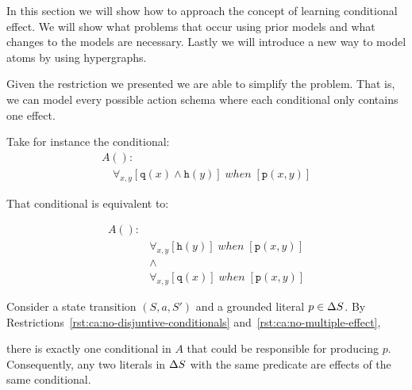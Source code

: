 \documentclass[\master/Master.tex]{subfiles}
\begin{document}
%

In this section we will show how to approach the concept of learning conditional effect. We will show what problems that occur using prior models and what changes to the models are necessary. Lastly we will introduce a new way to model atoms by using hypergraphs.


Given the restriction we presented we are able to simplify the problem. That is, we can model every possible action schema where each conditional only contains one effect.

\begin{example}
	Take for instance the conditional:	
	\begin{align*}
		&A():&  \\
		&\quad
		\forall_{x, y}
			\left[
				\texttt{q}(x) \land \texttt{h}(y)
			\right]
		\; when \;
		\left[ \texttt{p}(x,y) \right]
	\end{align*}	
	
	That conditional is equivalent to: 
	
	\begin{align*}
		A():&  \\
			 &\forall_{x, y}
				\left[
				\texttt{h}(y)
				\right]
				\; when \;
				\left[ \texttt{p}(x,y) \right] \\
		&\land 	\\		
		&\forall_{x, y}
		\left[
		\texttt{q}(x)
		\right]
		\; when \;
		\left[ \texttt{p}(x,y) \right]
	\end{align*}
	
\end{example}



\begin{proposition}\label{prop:ca:singleConditional}
    Consider a state transition $\left(S, a, S'\right)$ and a grounded literal $p \in \Delta S$. By Restrictions~\ref{rst:ca:no-disjuntive-conditionals} and~\ref{rst:ca:no-multiple-effect}, 
    
    there is exactly one conditional in $A$ that could be responsible for producing $p$. Consequently, any two literals in $\Delta S$ with the same predicate are effects of the same conditional.
\end{proposition}
\end{document}
